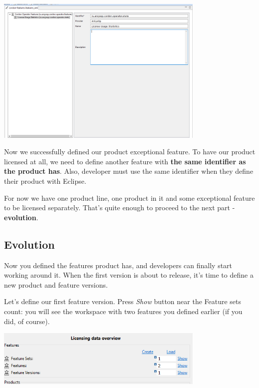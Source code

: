 \documentclass[12pt]{report}
\begin{document}
\begin{center}
    \includegraphics[width=0.75\textwidth]{feature_dialog}
\end{center}

Now we successfully defined our product exceptional feature. To have our product licensed at all, we need to define another feature with \textbf{the same identifier as the product has}.
Also, developer must use the same identifier when they define their product with Eclipse.

For now we have one product line, one product in it and some exceptional feature to be licensed separately. That's quite enough to proceed to the next part - \textbf{evolution}.

\subsection*{Evolution}

Now you defined the features product has, and developers can finally start working around it. When the first version is about to release, it's time to define
a new product and feature versions.

Let's define our first feature version. Press \textit{Show} button near the Feature sets count: you will see the workspace with two features
you defined earlier (if you did, of course).

\begin{center}
    \includegraphics[width=0.75\textwidth]{feature_set_show}
\end{center}
\end{document}
